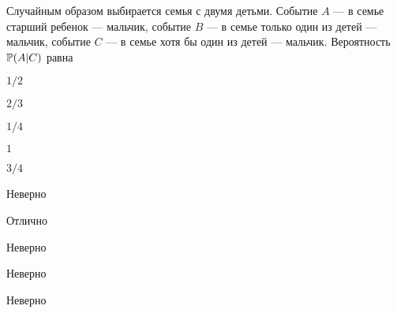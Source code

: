 
\begin{question}
Случайным образом выбирается семья с двумя детьми. Событие \(A\) --- в
семье старший ребенок --- мальчик, событие \(B\) --- в семье только один
из детей --- мальчик, событие \(C\) --- в семье хотя бы один из детей
--- мальчик. Вероятность \(\P(A | C)\) равна
\begin{answerlist}
  \item \(1/2\)
  \item \(2/3\)
  \item \(1/4\)
  \item \(1\)
  \item \(3/4\)
\end{answerlist}
\end{question}

\begin{solution}
\begin{answerlist}
  \item Неверно
  \item Отлично
  \item Неверно
  \item Неверно
  \item Неверно
\end{answerlist}
\end{solution}

